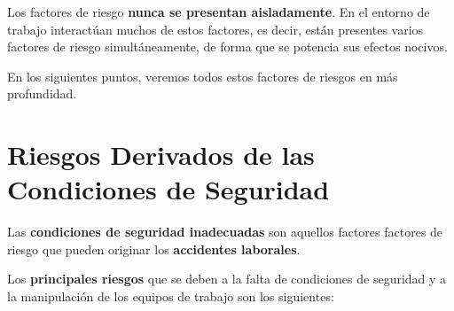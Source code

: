 Los factores de riesgo \textbf{nunca se presentan aisladamente}. En el entorno de trabajo interactúan muchos de estos factores, es decir, están presentes varios factores de riesgo simultáneamente, de forma que se potencia sus efectos nocivos.

En los siguientes puntos, veremos todos estos factores de riesgos en más profundidad.

\section{Riesgos Derivados de las Condiciones de Seguridad}
Las \textbf{condiciones de seguridad inadecuadas} son aquellos factores factores de riesgo que pueden originar los \textbf{accidentes laborales}.

Los \textbf{principales riesgos }que se deben a la falta de condiciones de seguridad y a la manipulación de los equipos de trabajo son los siguientes:

